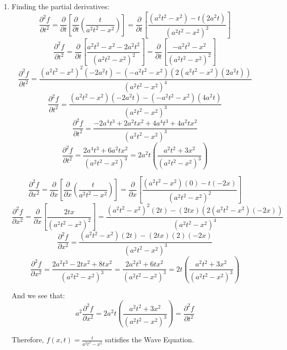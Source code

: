 \begin{Answer}[ref = wave]
\begin{enumerate}
    Therefore, $f(x, t) = \sin{ \left( x - a t \right)} + \ln{ \left( x + a t 
    \right)}$ satisfies the Wave Equation. 

    \item Finding the partial derivatives:
    $$\frac{\partial^2 f}{\partial t^2} = \frac{\partial}{\partial t} \left[ 
    \frac{\partial}{\partial t} \left( \frac{t}{a^2 t^2 - x^2} \right) \right] 
    = \frac{\partial}{\partial t} \left[ \frac{\left(a^2 t^2 - x^2 \right) - t 
    \left(2 a^2 t \right)}{\left( a^2 t^2 - x^2 \right)^2} \right]$$
    $$\frac{\partial^2 f}{\partial t^2} = \frac{\partial}{\partial t} \left[ 
    \frac{a^2 t^2 - x^2 - 2 a^2 t^2}{\left( a^2 t^2 - x^2 \right)^2} \right] = 
    \frac{\partial}{\partial t} \left[ \frac{-a^2 t^2 - x^2}{\left( a^2 t^2 - 
    x^2 \right)^2} \right]$$
    $$\frac{\partial^2 f}{\partial t^2} = \frac{\left( a^2 t^2 - x^2 \right)^2 
    \left(-2 a^2t \right) - \left( -a^2 t^2 - x^2 \right) \left( 2 \left( a^2 
    t^2 - x^2 \right) \left( 2 a^2 t \right) \right)}{\left( a^2 t^2 - x^2 
    \right)^4}$$
    $$\frac{\partial^2 f}{\partial t^2} = \frac{\left( a^2 t^2 - x^2 \right) 
    \left( -2 a^2 t \right) - \left( -a^2 t^2 - x^2 \right) \left( 4 a^2 t 
    \right)}{\left( a^2 t^2 - x^2 \right)^3}$$
    $$\frac{\partial^2 f}{\partial t^2} = \frac{ -2 a^4 t^3 + 2 a^2 t x^2 + 4 
    a^4 t^3 + 4 a^2  t x^2}{\left( a^2 t^2 - x^2 \right)^3}$$
    $$\frac{\partial^2 f}{\partial t^2} = \frac{ 2 a^4 t^3 + 6 a^2 t x^2}{
    \left( a^2 t^2 - x^2 \right)^3} = 2 a^2 t \left( \frac{a^2 t^2 + 3 x^2}{
    \left( a^2 t^2 - x^2 \right)^3} \right)$$

    $$\frac{\partial^2 f}{\partial x^2} = \frac{\partial}{\partial x} \left[ 
    \frac{\partial}{\partial x} \left( \frac{t}{a^2 t^2 - x^2} \right) \right] 
    = \frac{\partial}{\partial x} \left[ \frac{\left( a^2 t^2 - x^2 \right) 
    \left( 0 \right) - t \left( -2 x \right)}{\left( a^2  t^2 - x^2 \right)^2} 
    \right]$$
    $$\frac{\partial^2 f}{\partial x^2} = \frac{\partial}{\partial x} \left[ 
    \frac{2 t x}{\left( a^2 t^2 - x^2 \right)^2} \right] = \frac{\left( a^2 
    t^2 - x^2 \right)^2 \left( 2 t \right) - \left( 2 t x \right) \left( 2 
    \left( a^2 t^2 - x^2 \right) \left( -2 x \right) \right)}{\left( a^2 t^2 - 
    x^2 \right)^4}$$
    $$\frac{\partial^2 f}{\partial x^2} = \frac{\left( a^2 t^2 - x^2 \right) 
    \left( 2 t \right) - \left( 2 t x \right) \left( 2 \right) \left( -2 x 
    \right)}{\left( a^2 t^2 - x^2 \right)^3}$$
    $$\frac{\partial^2 f}{\partial x^2} = \frac{2 a^2 t^3 - 2 t x^2 + 8 t x^2}{
    \left( a^2 t^2 - x^2 \right)^3} = \frac{2 a^2 t^3 + 6 t x^2}{\left( a^2 
    t^2 - x^2 \right)^3} = 2 t \left( \frac{a^2 t^2 + 3 x^2}{\left( a^2 t^2 - 
    x^2 \right)^3} \right)$$

    And we see that:
    $$a^2 \frac{\partial^2 f}{\partial x^2} = 2 a^2 t \left( \frac{a^2 t^2 + 3 
    x^2}{\left( a^2 t^2 - x^2 \right)^3} \right) = \frac{\partial^2 f}{
    \partial t^2}$$

    Therefore, $f(x, t) = \frac{t}{a^2t^2 - x^2}$ satisfies the Wave Equation. 
\end{enumerate}
\end{Answer}

